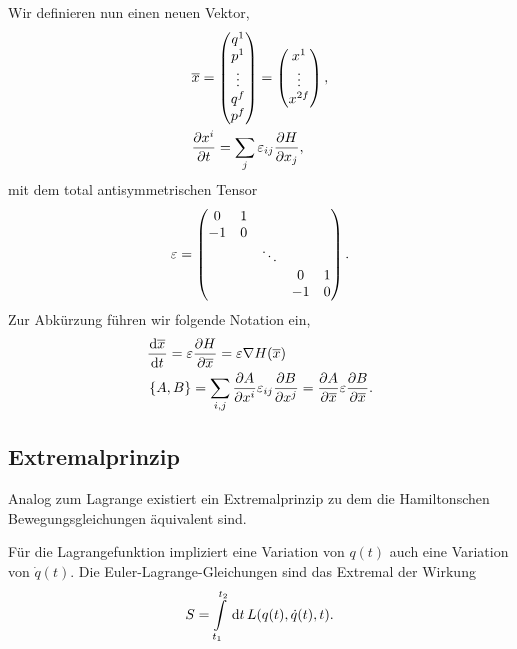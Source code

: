 Wir definieren nun einen neuen Vektor,
\begin{align*}
&\overline{x} = 
\begin{pmatrix}
q^1\\ p^1 \\ \vdots \\ q^f\\p^f
\end{pmatrix}
=
\begin{pmatrix}
x^1\\\vdots\\ x^{2f}
\end{pmatrix},\\
&\frac{\partial x^i}{\partial t}
= 
\sum_j \varepsilon_{ij} \frac{\partial H}{\partial x_j},
\end{align*}
mit dem total antisymmetrischen Tensor
\begin{align*}
\varepsilon =
\begin{pmatrix}
\begin{matrix}
0 & 1\\
-1 & 0
\end{matrix}\\
& \ddots\\
&& \begin{matrix}
0 & 1\\
-1 & 0
\end{matrix}
\end{pmatrix}.
\end{align*}
Zur Abkürzung führen wir folgende Notation ein,
\begin{align*}
&\frac{\mathrm{d} \overline{x}}{\,\mathrm{d} t\,} = \varepsilon\frac{\partial H}{\partial \overline{x}} =
\varepsilon\nabla H(\overline{x})\\
& \left\{ A,B \right\} = \sum_{i,j} \frac{\partial A}{\partial x^i} \varepsilon_{ij}
\frac{\partial B}{\partial x^j} = \frac{\partial A}{\partial
\overline{x}}\varepsilon\frac{\partial B}{\partial \overline{x}}.
\end{align*}

\subsection{Extremalprinzip}

Analog zum Lagrange existiert ein Extremalprinzip zu dem die Hamiltonschen
Bewegungsgleichungen äquivalent sind.

Für die Lagrangefunktion impliziert eine Variation von $q(t)$ auch eine
Variation von $\dot{q}(t)$. Die Euler-Lagrange-Gleichungen sind das Extremal
der Wirkung
\begin{align*}
S=\int\limits_{t_1}^{t_2}\,\mathrm{d} t\, L(q(t),\dot{q}(t),t).
\end{align*}

